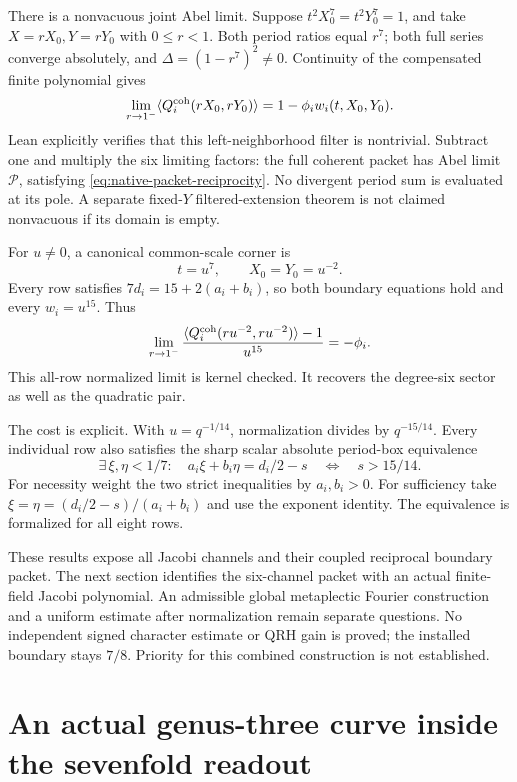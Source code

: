 \documentclass[11pt]{article}
\begin{document}
There is a nonvacuous joint Abel limit. Suppose
$t^2X_0^7=t^2Y_0^7=1$, and take $X=rX_0,Y=rY_0$ with
$0\le r<1$. Both period ratios equal $r^7$; both full series
converge absolutely, and $\Delta=(1-r^7)^2\ne0$.
Continuity of the compensated finite polynomial gives
\[
 \lim_{r\to1^-}\langle Q_i^{\rm coh}(rX_0,rY_0)\rangle
 =1-\phi_iw_i(t,X_0,Y_0).
\]
Lean explicitly verifies that this left-neighborhood filter is
nontrivial. Subtract one and multiply the six limiting factors:
the full coherent packet has Abel limit $\mathcal P$, satisfying
\eqref{eq:native-packet-reciprocity}. No divergent period sum is
evaluated at its pole. A separate fixed-$Y$ filtered-extension
theorem is not claimed nonvacuous if its domain is empty.

For $u\ne0$, a canonical common-scale corner is
\[
 t=u^7,\qquad X_0=Y_0=u^{-2}.
\]
Every row satisfies $7d_i=15+2(a_i+b_i)$, so both boundary
equations hold and every $w_i=u^{15}$. Thus
\begin{equation}
 \lim_{r\to1^-}
 \frac{\langle Q_i^{\rm coh}(ru^{-2},ru^{-2})\rangle-1}{u^{15}}
 =-\phi_i .
 \label{eq:normalized-jacobi-abel}
\end{equation}
This all-row normalized limit is kernel checked. It recovers
the degree-six sector as well as the quadratic pair.

The cost is explicit. With $u=q^{-1/14}$, normalization divides
by $q^{-15/14}$. Every individual row also satisfies the sharp
scalar absolute period-box equivalence
\[
 \exists\,\xi,\eta<1/7:\quad
 a_i\xi+b_i\eta=d_i/2-s
 \quad\Longleftrightarrow\quad s>15/14 .
\]
For necessity weight the two strict inequalities by $a_i,b_i>0$.
For sufficiency take
$\xi=\eta=(d_i/2-s)/(a_i+b_i)$ and use the exponent identity.
The equivalence is formalized for all eight rows.

These results expose all Jacobi channels and their coupled
reciprocal boundary packet. The next section identifies the
six-channel packet with an actual finite-field Jacobi polynomial.
An admissible global metaplectic Fourier construction and a
uniform estimate after normalization remain separate questions.
No independent signed character estimate or QRH gain is proved;
the installed boundary stays $7/8$.
Priority for this combined construction is not established.

\section{An actual genus-three curve inside the sevenfold readout}
\label{sec:G2-seven-curve}
\end{document}
